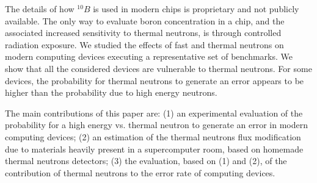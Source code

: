 The details of how  $^{10}B$ is used in modern chips is proprietary and not publicly available. The only way to evaluate boron concentration in a chip, and the associated increased sensitivity to thermal neutrons, is through controlled radiation exposure. We studied the effects of fast and thermal neutrons on modern computing devices executing a representative set of benchmarks.
We show that all the considered devices are vulnerable to thermal neutrons. For some devices, the probability for thermal neutrons to generate an error appears to be higher than the probability due to high energy neutrons.  

The main contributions of this paper are: (1) an experimental evaluation of the probability for a high energy vs. thermal neutron to generate an error in modern computing devices; (2) an estimation of the thermal neutrons flux modification due to materials heavily present in a supercomputer room, based on homemade thermal neutrons detectors; (3) the evaluation, based on (1) and (2), of the contribution of thermal neutrons to the error rate of computing devices. 



